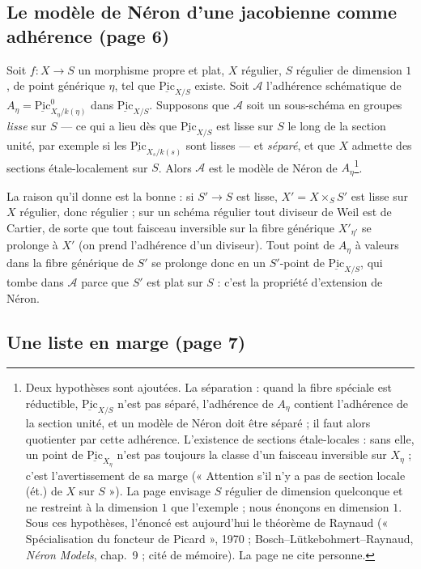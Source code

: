 \documentclass[11pt,a4paper]{article}
\begin{document}
\subsection*{Le modèle de Néron d'une jacobienne comme adhérence (page 6)}

Soit $f : X \to S$ un morphisme propre et plat, $X$ régulier, $S$ régulier
de dimension $1$, de point générique $\eta$, tel que
$\underline{\mathrm{Pic}}_{X/S}$ existe. Soit $\mathcal{A}$ l'adhérence
schématique de $A_\eta = \underline{\mathrm{Pic}}^0_{X_\eta/k(\eta)}$ dans
$\underline{\mathrm{Pic}}_{X/S}$. Supposons que $\mathcal{A}$ soit un
sous-schéma en groupes \emph{lisse} sur $S$ — ce qui a lieu dès que
$\underline{\mathrm{Pic}}_{X/S}$ est lisse sur $S$ le long de la section
unité, par exemple si les $\underline{\mathrm{Pic}}_{X_s/k(s)}$ sont
lisses — et \emph{séparé}, et que $X$ admette des sections étale-localement
sur $S$. Alors $\mathcal{A}$ est le modèle de Néron de $A_\eta$\footnote{Deux
hypothèses sont ajoutées. La séparation : quand la fibre spéciale est
réductible, $\underline{\mathrm{Pic}}_{X/S}$ n'est pas séparé, l'adhérence
de $A_\eta$ contient l'adhérence de la section unité, et un modèle de
Néron doit être séparé ; il faut alors quotienter par cette adhérence.
L'existence de sections étale-locales : sans elle, un point de
$\underline{\mathrm{Pic}}_{X_\eta}$ n'est pas toujours la classe d'un
faisceau inversible sur $X_\eta$ ; c'est l'avertissement de sa marge
(« Attention s'il n'y a pas de section locale (ét.) de $X$ sur $S$ »). La
page envisage $S$ régulier de dimension quelconque et ne restreint à la
dimension $1$ que l'exemple ; nous énonçons en dimension $1$. Sous ces
hypothèses, l'énoncé est aujourd'hui le théorème de Raynaud
(« Spécialisation du foncteur de Picard », 1970 ; Bosch–Lütkebohmert–Raynaud,
\emph{Néron Models}, chap.~9 ; cité de mémoire). La page ne cite personne.}.

La raison qu'il donne est la bonne : si $S' \to S$ est lisse,
$X' = X \times_S S'$ est lisse sur $X$ régulier, donc régulier ; sur un
schéma régulier tout diviseur de Weil est de Cartier, de sorte que tout
faisceau inversible sur la fibre générique $X'_{\eta'}$ se prolonge à $X'$
(on prend l'adhérence d'un diviseur). Tout point de $A_\eta$ à valeurs dans
la fibre générique de $S'$ se prolonge donc en un $S'$-point de
$\underline{\mathrm{Pic}}_{X/S}$, qui tombe dans $\mathcal{A}$ parce que
$S'$ est plat sur $S$ : c'est la propriété d'extension de Néron.

\subsection*{Une liste en marge (page 7)}
\end{document}
